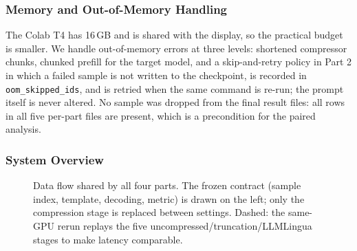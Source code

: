 \documentclass[10pt,a4paper,twocolumn]{article}
\begin{document}
\subsubsection{Memory and Out-of-Memory Handling}

The Colab T4 has 16\,GB and is shared with the display, so the practical budget is
smaller. We handle out-of-memory errors at three levels: shortened compressor
chunks, chunked prefill for the target model, and a skip-and-retry policy in Part 2 in which a failed sample is not written to the checkpoint, is recorded in \texttt{oom\_skipped\_ids}, and is retried when the same command is re-run; the prompt itself is never altered. No sample was dropped from the final
result files: all rows in all five per-part files are present, which is a
precondition for the paired analysis.

\subsubsection{System Overview}

\begin{figure}[t]
\centering
{}
\caption{Data flow shared by all four parts. The frozen contract (sample index,
template, decoding, metric) is drawn on the left; only the compression stage is
replaced between settings. Dashed: the same-GPU rerun replays the five
uncompressed/truncation/LLMLingua stages to make latency comparable.}
\label{fig:system}
\end{figure}
\end{document}
